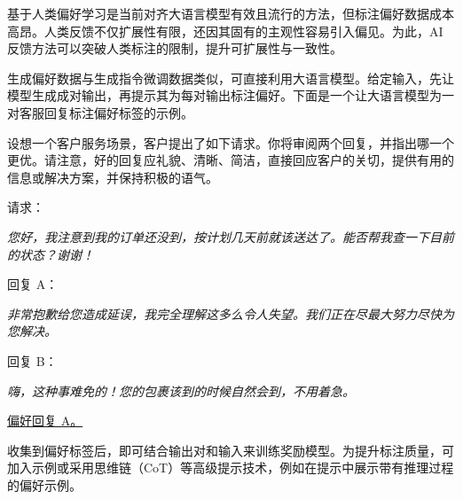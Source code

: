 \noindent 基于人类偏好学习是当前对齐大语言模型有效且流行的方法，但标注偏好数据成本高昂。人类反馈不仅扩展性有限，还因其固有的主观性容易引入偏见。为此，AI 反馈方法可以突破人类标注的限制，提升可扩展性与一致性。

生成偏好数据与生成指令微调数据类似，可直接利用大语言模型。给定输入，先让模型生成成对输出，再提示其为每对输出标注偏好。下面是一个让大语言模型为一对客服回复标注偏好标签的示例。

\vspace{0.5em}
\begin{tcolorbox}

\begingroup
\setlength{\leftskip}{2em}
\setlength{\rightskip}{2em}

设想一个客户服务场景，客户提出了如下请求。你将审阅两个回复，并指出哪一个更优。请注意，好的回复应礼貌、清晰、简洁，直接回应客户的关切，提供有用的信息或解决方案，并保持积极的语气。

\vspace{0.3cm}

请求：

\vspace{0.1cm}

\textit{您好，我注意到我的订单还没到，按计划几天前就该送达了。能否帮我查一下目前的状态？谢谢！}

\vspace{0.2cm}

回复 A：

\vspace{0.1cm}

\textit{非常抱歉给您造成延误，我完全理解这多么令人失望。我们正在尽最大努力尽快为您解决。}

\vspace{0.3cm}

回复 B：

\vspace{0.1cm}

\textit{嗨，这种事难免的！您的包裹该到的时候自然会到，不用着急。}

\vspace{0.3cm}

\underline{偏好回复 A。}

\endgroup

\end{tcolorbox}
\vspace{0.5em}

收集到偏好标签后，即可结合输出对和输入来训练奖励模型。为提升标注质量，可加入示例或采用思维链（CoT）等高级提示技术，例如在提示中展示带有推理过程的偏好示例。

